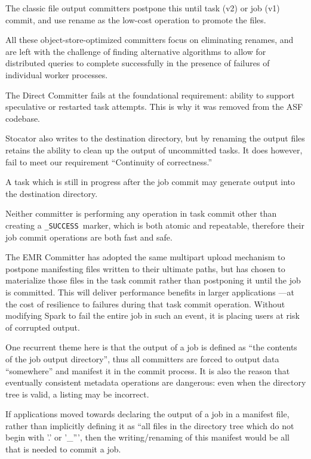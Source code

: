 \documentclass[format=acmsmall, screen=true, nonacm, timestamp, review=false]{acmart}
\newcommand{\SUCCESS}{\texttt{\_SUCCESS}\ }
\begin{document}
The classic file output committers postpone this until task (v2) or job (v1)
commit, and use rename as the low-cost operation to promote the files.

All these object-store-optimized committers focus on eliminating renames,
and are left with the challenge of finding alternative algorithms to
allow for distributed queries to complete successfully in the presence
of failures of individual worker processes.


The Direct Committer fails at the foundational requirement: ability to support
speculative or restarted task attempts.
This is why it was removed from the ASF codebase.

Stocator also writes to the destination directory, but by renaming the output
files retains the ability to clean up the output of uncommitted tasks.
It does however, fail to meet our requirement ``Continuity of correctness.''

A task which is still in progress after the job commit may generate output
into the destination directory.

Neither committer is performing any operation in task commit other than creating
a \SUCCESS marker, which is both atomic and repeatable, therefore their job commit
operations are both fast and safe.

The EMR Committer has adopted the same multipart upload mechanism to postpone
manifesting files written to their ultimate paths, but has chosen to materialize
those files in the task commit rather than postponing it until the job is committed.
This will deliver performance benefits in larger applications ---at the cost
of resilience to failures during that task commit operation.
Without modifying Spark to fail the entire job in such an event, it is placing
users at risk of corrupted output.


One recurrent theme here is that the output of a job is defined as
``the contents of the job output directory'', thus all committers are
forced to output data ``somewhere'' and manifest it in the commit process.
It is also the reason that eventually consistent metadata operations are
dangerous: even when the directory tree is valid, a listing may be incorrect.

If applications moved towards declaring the output of a job in
a manifest file, rather than implicitly defining it as ``all files in the directory
tree which do not begin with '.' or '\_''', then the writing/renaming
of this manifest would be all that is needed to commit a job.
\end{document}
